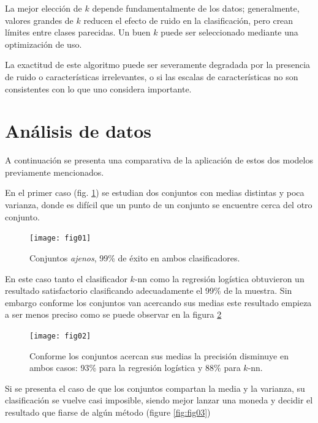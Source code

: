\documentclass[11pt,letterpaper,reqno]{article}
\begin{document}
La mejor elección de $ k $ depende fundamentalmente de los datos; generalmente, valores grandes de $ k $ reducen el efecto de ruido en la clasificación, pero crean límites entre clases parecidas. Un buen $ k $ puede ser seleccionado mediante una optimización de uso.

La exactitud de este algoritmo puede ser severamente degradada por la presencia de ruido o características irrelevantes, o si las escalas de características no son consistentes con lo que uno considera importante.

\section{Análisis de datos}

A continuación se presenta una comparativa de la aplicación de estos dos modelos previamente mencionados.

En el primer caso (fig. \ref{fig:fig01}) se estudian dos conjuntos con medias distintas y poca varianza, donde es difícil que un punto de un conjunto se encuentre cerca del otro conjunto.

\begin{figure}[h]
	\begin{center}
		\texttt{[image: fig01]}
	\end{center}
	\caption{Conjuntos \textit{ajenos}, 99\% de éxito en ambos clasificadores.}
	\label{fig:fig01}
\end{figure}

En este caso tanto el clasificador $k$-nn como la regresión logística obtuvieron un resultado satisfactorio clasificando adecuadamente el 99\% de la muestra. Sin embargo conforme los conjuntos van acercando sus medias este resultado empieza a ser menos preciso como se puede observar en la figura \ref{fig:fig02}

\begin{figure}[h]
	\begin{center}
		\texttt{[image: fig02]}
	\end{center}
	\caption{Conforme los conjuntos acercan sus medias la precisión disminuye en ambos casos: 93\% para la regresión logística y 88\% para $k$-nn.}
	\label{fig:fig02}
\end{figure}

Si se presenta el caso de que los conjuntos compartan la media y la varianza, su clasificación se vuelve casi imposible, siendo mejor lanzar una moneda y decidir el resultado que fiarse de algún método (figure \ref{fig:fig03})
\end{document}
